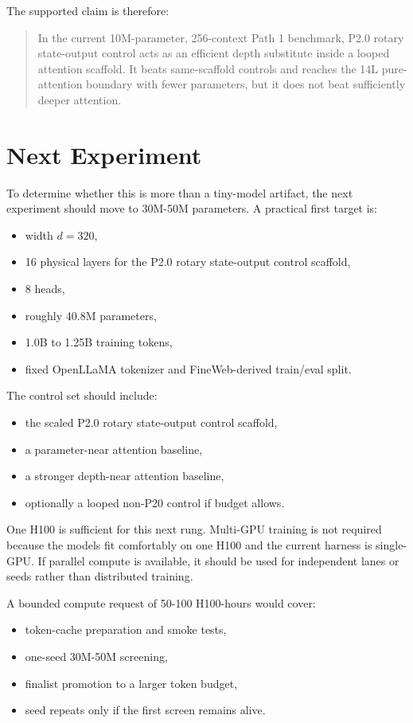 \documentclass[11pt]{article}
\newcommand{\pshort}{P20}
\newcommand{\pcontrol}{P2.0 rotary state-output control}
\begin{document}
The supported claim is therefore:

\begin{quote}
In the current 10M-parameter, 256-context Path 1 benchmark, \pcontrol{} acts as
an efficient depth substitute inside a looped attention scaffold. It beats
same-scaffold controls and reaches the 14L pure-attention boundary with fewer
parameters, but it does not beat sufficiently deeper attention.
\end{quote}

\section{Next Experiment}

To determine whether this is more than a tiny-model artifact, the next
experiment should move to 30M-50M parameters. A practical first target is:

\begin{itemize}
  \item width $d=320$,
  \item 16 physical layers for the \pcontrol{} scaffold,
  \item 8 heads,
  \item roughly 40.8M parameters,
  \item 1.0B to 1.25B training tokens,
  \item fixed OpenLLaMA tokenizer and FineWeb-derived train/eval split.
\end{itemize}

The control set should include:

\begin{itemize}
  \item the scaled \pcontrol{} scaffold,
  \item a parameter-near attention baseline,
  \item a stronger depth-near attention baseline,
  \item optionally a looped non-\pshort{} control if budget allows.
\end{itemize}

One H100 is sufficient for this next rung. Multi-GPU training is not required
because the models fit comfortably on one H100 and the current harness is
single-GPU. If parallel compute is available, it should be used for independent
lanes or seeds rather than distributed training.

A bounded compute request of 50-100 H100-hours would cover:

\begin{itemize}
  \item token-cache preparation and smoke tests,
  \item one-seed 30M-50M screening,
  \item finalist promotion to a larger token budget,
  \item seed repeats only if the first screen remains alive.
\end{itemize}
\end{document}
